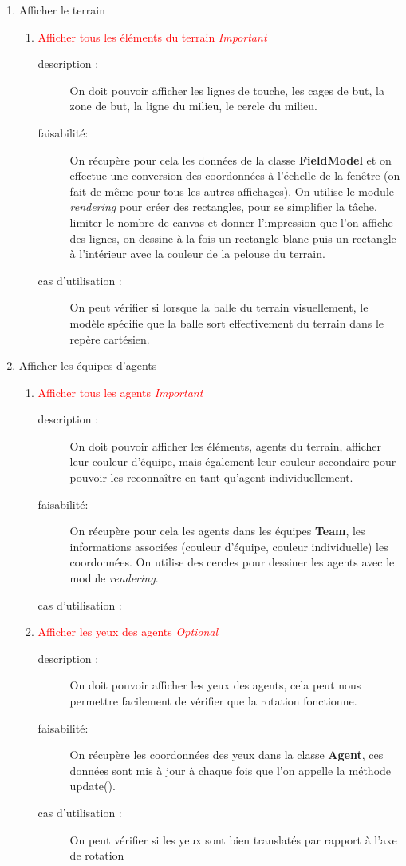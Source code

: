 \documentclass[11pt, a4paper]{article}
\newcommand{\besoinVItem}[4]{
	\item #1
	\begin{description}
		\item[description :]
		#2
		\item[faisabilité: ]
		#3
		\item[cas d'utilisation :]
		#4
	\end{description}
}
\begin{document}
\begin{enumerate}
\begin{enumerate}
\begin{enumerate}
			\end{enumerate}


			\item Afficher le terrain
			\begin{enumerate}
				\besoinVItem{\textcolor{red}{Afficher tous les éléments du terrain \textit{Important}}
				}
				{On doit pouvoir afficher les lignes de touche, les cages de but, la zone de but, la ligne du milieu, le cercle du milieu.

				}
				{On récupère pour cela les données de la classe \textbf{FieldModel} et on effectue une conversion des coordonnées à l'échelle de la
				fenêtre (on fait de même pour tous les autres affichages). On utilise le module \textit{rendering} pour créer des rectangles, pour se simplifier la tâche, limiter le nombre de canvas et donner l'impression que l'on affiche des lignes, on dessine à la fois un rectangle blanc puis un rectangle à l'intérieur avec la couleur de la pelouse du terrain.
				}
				{On peut vérifier si lorsque la balle du terrain visuellement, le modèle spécifie que la balle sort effectivement du terrain dans
				le repère cartésien.}

			\end{enumerate}



			\item Afficher les équipes d'agents
			\begin{enumerate}
				\besoinVItem{\textcolor{red}{Afficher tous les agents \textit{Important}}
				}
				{On doit pouvoir afficher les éléments, agents du terrain, afficher leur couleur d'équipe, mais également leur couleur secondaire pour pouvoir les reconnaître en tant qu'agent individuellement.

				}
				{On récupère pour cela les agents dans les équipes \textbf{Team}, les informations associées (couleur d'équipe, couleur individuelle) les coordonnées. On utilise des cercles pour dessiner les agents avec le module \textit{rendering}.

				}
				{}

				\besoinVItem{\textcolor{red}{Afficher les yeux des agents \textit{Optional}}
				}
				{On doit pouvoir afficher les yeux des agents, cela peut nous permettre facilement de vérifier que la rotation fonctionne.

				}
				{On récupère les coordonnées des yeux dans la classe \textbf{Agent}, ces données sont mis à jour à chaque fois que l'on appelle la
				méthode update().
				}
				{On peut vérifier si les yeux sont bien translatés par rapport à l'axe de rotation}


\end{enumerate}
\end{enumerate}
\end{enumerate}
\end{document}
